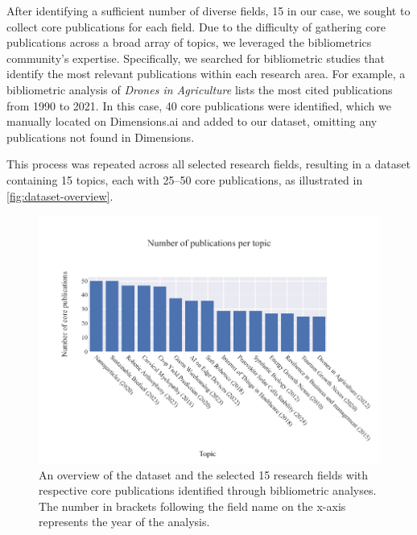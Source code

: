 After identifying a sufficient number of diverse fields, 15 in our case, we sought to collect core publications for each field. Due to the difficulty of gathering core publications across a broad array of topics, we leveraged the bibliometrics community’s expertise. Specifically, we searched for bibliometric studies that identify the most relevant publications within each research area. For example, a bibliometric analysis of \textit{Drones in Agriculture} \autocite{Rejeb2022} lists the most cited publications from 1990 to 2021. In this case, 40 core publications were identified, which we manually located on Dimensions.ai and added to our dataset, omitting any publications not found in Dimensions.

This process was repeated across all selected research fields, resulting in a dataset containing 15 topics, each with 25–50 core publications, as illustrated in \autoref{fig:dataset-overview}.
\begin{figure}
	\centering	
	\includegraphics{pics/dataset-overview.pdf}
	\caption[Dataset overview of the research topics]{An overview of the dataset and the selected 15 research fields with respective core publications identified through bibliometric analyses. The number in brackets following the field name on the x-axis represents the year of the analysis.}
	\label{fig:dataset-overview}
\end{figure}


